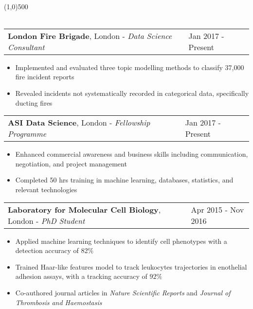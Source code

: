 \documentclass[11pt]{res}
\begin{document}
\vspace{-1.2em}
\begin{flushleft}
\\
\end{flushleft}
\vspace{-3.2em}

\line(1,0){500}\\
\vspace*{-0.3cm}
\nolinebreak\\
\begin{tabular}{@{} p{13.7cm} p{3.5cm} @{}} {\bf London Fire Brigade}, London - \emph{Data Science Consultant} & Jan 2017 - Present \end{tabular}
\vspace{-1.0em}
\textcolor{mygray}{
\begin{itemize} %
\item \textmd{Implemented and evaluated three topic modelling methods to classify 37,000 fire incident reports}
\item \textmd{Revealed incidents not systematically recorded in categorical data, specifically ducting fires}
\end{itemize}
}
\vspace{-1.0em}
\begin{tabular}{@{} p{13.7cm} p{3.5cm} @{}} {\bf ASI Data Science}, London - \emph{Fellowship Programme} & Jan 2017 - Present \end{tabular}
\vspace{-1.0em}
\textcolor{mygray}{
\begin{itemize} %
\item \textmd{Enhanced commercial awareness and  business skills including communication, negotiation, and project management}
\item \textmd{Completed 50 hrs training in machine learning, databases, statistics, and relevant technologies}
\end{itemize}
}
\vspace{-1.0em}
\begin{tabular}{@{} p{13.7cm} p{3.5cm} @{}} {\bf Laboratory for Molecular Cell Biology}, London - \emph{PhD Student} & Apr 2015 - Nov 2016 \end{tabular}
\begin{addmargin}[0em]{0em}
\vspace{-1.0em}
\textcolor{mygray}{
\begin{itemize} %
\item Applied machine learning techniques to identify cell phenotypes with a detection accuracy of 82$\%$
\item Trained Haar-like features model to track leukocytes trajectories in enothelial adhesion assays, with a tracking accuracy of $92\%$
\item Co-authored journal articles in \emph{Nature Scientific Reports} and \emph{Journal of Thrombosis and Haemostasis}
\end{itemize}
}
\end{addmargin}
\end{document}
